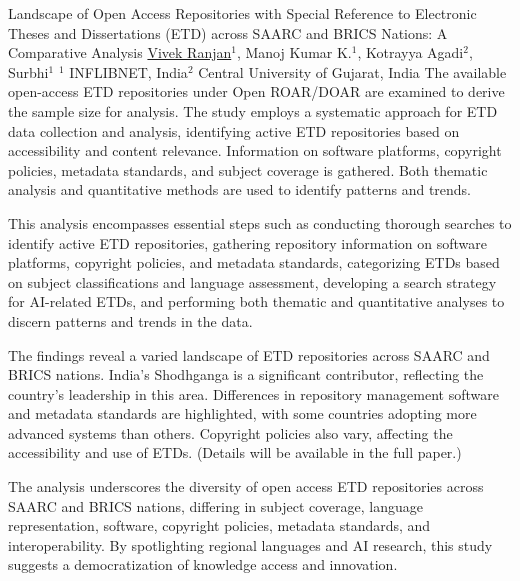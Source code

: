 \begin{abstract_online}{Landscape of Open Access Repositories with Special Reference to Electronic Theses and Dissertations (ETD) across SAARC and BRICS Nations: A Comparative Analysis}{%
    \underline{Vivek Ranjan}$^{1}$, Manoj Kumar K.$^{1}$, Kotrayya Agadi$^{2}$, Surbhi$^{1}$}{%
    }{%
    $^1$ INFLIBNET, India\newline{}$^2$ Central University of Gujarat, India}
The available open-access ETD repositories under Open ROAR/DOAR are examined to derive the sample size for analysis. The study employs a systematic approach for ETD data collection and analysis, identifying active ETD repositories based on accessibility and content relevance. Information on software platforms, copyright policies, metadata standards, and subject coverage is gathered. Both thematic analysis and quantitative methods are used to identify patterns and trends.

This analysis encompasses essential steps such as conducting thorough searches to identify active ETD repositories, gathering repository information on software platforms, copyright policies, and metadata standards, categorizing ETDs based on subject classifications and language assessment, developing a search strategy for AI-related ETDs, and performing both thematic and quantitative analyses to discern patterns and trends in the data.

The findings reveal a varied landscape of ETD repositories across SAARC and BRICS nations. India's Shodhganga is a significant contributor, reflecting the country's leadership in this area. Differences in repository management software and metadata standards are highlighted, with some countries adopting more advanced systems than others. Copyright policies also vary, affecting the accessibility and use of ETDs. (Details will be available in the full paper.)

The analysis underscores the diversity of open access ETD repositories across SAARC and BRICS nations, differing in subject coverage, language representation, software, copyright policies, metadata standards, and interoperability. By spotlighting regional languages and AI research, this study suggests a democratization of knowledge access and innovation.

\end{abstract_online}

